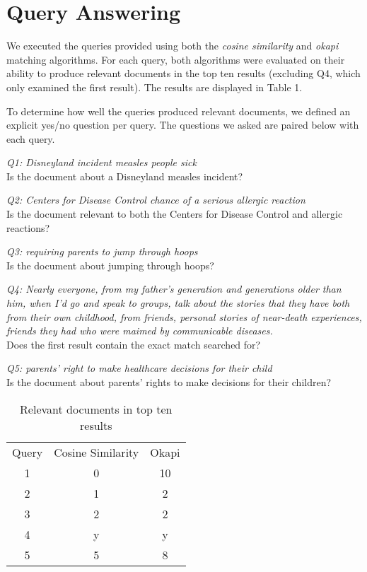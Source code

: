 \documentclass{article}
\begin{document}
\section{Query Answering}
We executed the queries provided using both the \textit{cosine similarity} and \textit{okapi} matching algorithms. For each query, both algorithms were evaluated on their ability to produce relevant documents in the top ten results (excluding Q4, which only examined the first result). The results are displayed in Table 1.

To determine how well the queries produced relevant documents, we defined an explicit yes/no question per query. The questions we asked are paired below with each query.

\hfill

\noindent
\textit{Q1: Disneyland incident measles people sick}
\\
Is the document about a Disneyland measles incident?

\noindent
\textit{Q2: Centers for Disease Control chance of a serious allergic reaction}
\\
Is the document relevant to both the Centers for Disease Control and allergic reactions?

\noindent
\textit{Q3: requiring parents to jump through hoops}
\\
Is the document about jumping through hoops?

\noindent
\textit{Q4: Nearly everyone, from my father's generation and generations older than him, when I'd go and speak to groups, talk about the stories that they have both from their own childhood, from friends, personal stories of near-death experiences, friends they had who were maimed by communicable diseases.}
\\
Does the first result contain the exact match searched for?

\noindent
\textit{Q5: parents' right to make healthcare decisions for their child}
\\
Is the document about parents' rights to make decisions for their children?

\begin{table}[]
\centering
\begin{tabular}{c | c | c}
Query & Cosine Similarity &  Okapi\\
1 & 0 & 10 \\
2 & 1 & 2 \\
3 & 2 & 2 \\
4 & y & y \\
5 & 5 & 8
\end{tabular}
\caption{Relevant documents in top ten results}
\label{tab:my_label}
\end{table}
\end{document}
